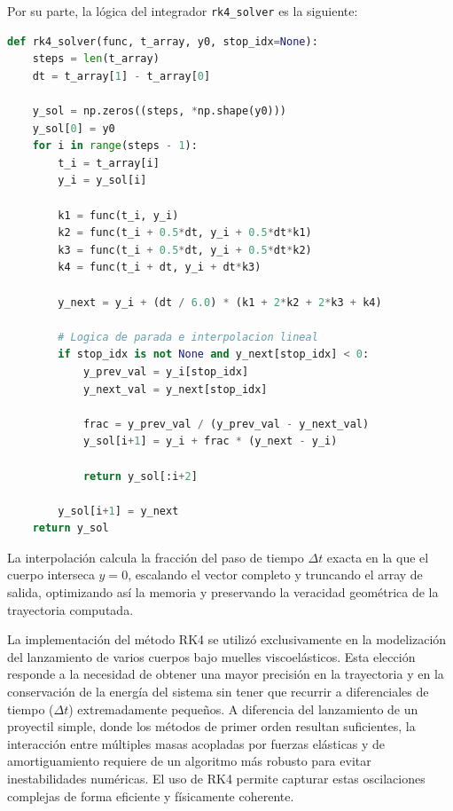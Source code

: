Por su parte, la lógica del integrador \texttt{rk4\_solver} es la siguiente:
\begin{lstlisting}[language=Python, caption={Implementación del método de Runge-Kutta 4 con interpolación de impacto.}]
def rk4_solver(func, t_array, y0, stop_idx=None):
    steps = len(t_array)
    dt = t_array[1] - t_array[0]
    
    y_sol = np.zeros((steps, *np.shape(y0)))
    y_sol[0] = y0
    for i in range(steps - 1):
        t_i = t_array[i]
        y_i = y_sol[i]
        
        k1 = func(t_i, y_i)
        k2 = func(t_i + 0.5*dt, y_i + 0.5*dt*k1)
        k3 = func(t_i + 0.5*dt, y_i + 0.5*dt*k2)
        k4 = func(t_i + dt, y_i + dt*k3)
        
        y_next = y_i + (dt / 6.0) * (k1 + 2*k2 + 2*k3 + k4)
        
        # Logica de parada e interpolacion lineal
        if stop_idx is not None and y_next[stop_idx] < 0:
            y_prev_val = y_i[stop_idx]
            y_next_val = y_next[stop_idx]
            
            frac = y_prev_val / (y_prev_val - y_next_val)
            y_sol[i+1] = y_i + frac * (y_next - y_i)
            
            return y_sol[:i+2]
    
        y_sol[i+1] = y_next
    return y_sol
\end{lstlisting}

La interpolación calcula la fracción del paso de tiempo $\Delta t$ exacta en la que el cuerpo interseca $y=0$, escalando el vector completo y truncando el array de salida, optimizando así la memoria y preservando la veracidad geométrica de la trayectoria computada.


La implementación del método RK4 se utilizó exclusivamente en la modelización del lanzamiento de varios cuerpos bajo muelles viscoelásticos. Esta elección responde a la necesidad de obtener una mayor precisión en la trayectoria y en la conservación de la energía del sistema sin tener que recurrir a diferenciales de tiempo ($\Delta t$) extremadamente pequeños. A diferencia del lanzamiento de un proyectil simple, donde los métodos de primer orden resultan suficientes, la interacción entre múltiples masas acopladas por fuerzas elásticas y de amortiguamiento requiere de un algoritmo más robusto para evitar inestabilidades numéricas. El uso de RK4 permite capturar estas oscilaciones complejas de forma eficiente y físicamente coherente.
